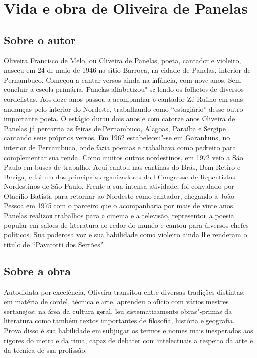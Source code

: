 \chapter{Vida e obra de Oliveira de Panelas}

\section{Sobre o autor}

Oliveira Francisco de Melo, ou Oliveira de Panelas, poeta, 
cantador e violeiro, nasceu em 24 de maio de 1946 no sítio 
Barroca, na cidade de Panelas, interior de Pernambuco. 
Começou a cantar versos ainda
na infância, com nove anos. Sem concluir a escola primária, Panelas
alfabetizou"-se lendo os folhetos de diversos cordelistas. Aos doze anos
passou a acompanhar o cantador Zé Rufino em suas andanças pelo interior
do Nordeste, trabalhando como ``estagiário'' desse outro
importante poeta. O estágio durou dois anos e com catorze anos Oliveira de Panelas
já percorria
as feiras de Pernambuco, Alagoas, Paraíba e Sergipe cantando seus
próprios versos. Em 1962 estabeleceu"-se em Garanhuns, no interior
de Pernambuco, onde fazia poemas e trabalhava como pedreiro para
complementar sua renda. Como muitos outros nordestinos, em 1972 veio a
São Paulo em busca de trabalho. Aqui cantou nas cantinas do Brás, Bom
Retiro e Bexiga, e foi um dos principais organizadores do I Congresso
de Repentistas Nordestinos de São Paulo. Frente a sua intensa atividade,
foi convidado por Otacílio Batista para retornar ao Nordeste como
cantador, chegando a João Pessoa em 1975 com o parceiro que o
acompanharia por mais de vinte anos. Panelas realizou trabalhos para o
cinema e a televisão, representou a poesia popular em salões de
literatura ao redor do mundo e cantou para diversos chefes políticos.
Sua poderosa voz e sua habilidade como violeiro ainda lhe renderam o
título de ``Pavarotti dos Sertões''.


\section{Sobre a obra}

Autodidata por excelência, Oliveira transitou entre diversas tradições distintas:
em matéria de cordel, técnica e arte, aprendeu o ofício com vários mestres sertanejos; na área da cultura geral, leu sistematicamente obras"-primas da literatura como também textos importantes de
filosofia, história e geografia. Prova disso é sua habilidade em subjugar os termos e nomes mais inesperados aos rigores do metro e da rima, capaz de
debater com intelectuais a respeito da arte e da técnica de
sua profissão.

